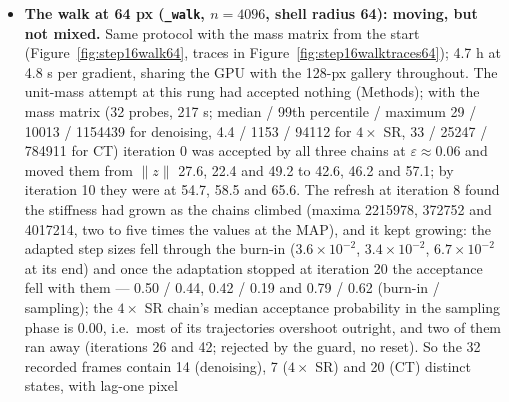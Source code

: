 \documentclass[11pt]{article}
\begin{document}
\begin{itemize}
        mediastinum for $4\times$ SR. The frames are now nearly
        independent: lag-one pixel autocorrelation 0.06, 0.08 and 0.08,
        and the r.m.s.\ difference between consecutive frames (0.108,
        0.108, 0.082) is at or above $\sqrt{2}$ times the std map, the
        value for independent draws. The 32-sample means agree with the
        main run's three-chain means (25.0, 25.6, 27.0 dB) to 0.1 dB on
        CT and fall 0.3 dB short on $4\times$ SR; on denoising the walk's
        26.8 dB is 1.8 dB above the main run's 25.0, which was the mean of
        chains that had stayed near the MAP --- a mean of shell samples
        against a mean of near-MAP states, not a like-for-like comparison.
        Wall time 44 min at 0.73 s per gradient, sharing the GPU with the
        64-px walk and the 128-px gallery (0.52 s per gradient alone).
  \item \textbf{The walk at 64 px (\texttt{\_walk}, $n = 4096$, shell
        radius 64): moving, but not mixed.} Same protocol with the mass
        matrix from the start (Figure~\ref{fig:step16walk64}, traces in
        Figure~\ref{fig:step16walktraces64}); 4.7 h at 4.8 s per gradient,
        sharing the GPU with the 128-px gallery throughout. The unit-mass
        attempt at this rung had accepted nothing (Methods); with the
        mass matrix (32 probes, 217 s; median / 99th percentile / maximum
        29 / 10013 / 1154439 for denoising, 4.4 / 1153 / 94112 for
        $4\times$ SR, 33 / 25247 / 784911 for CT) iteration 0 was accepted
        by all three chains at $\varepsilon \approx 0.06$ and moved them
        from $\|z\|$ 27.6, 22.4 and 49.2 to 42.6, 46.2 and 57.1; by
        iteration 10 they were at 54.7, 58.5 and 65.6. The refresh at
        iteration 8 found the stiffness had grown as the chains climbed
        (maxima 2215978, 372752 and 4017214, two to five times the values
        at the MAP), and it kept growing: the adapted step sizes fell
        through the burn-in ($3.6 \times 10^{-2}$, $3.4 \times 10^{-2}$,
        $6.7 \times 10^{-2}$ at its end) and once the adaptation stopped
        at iteration 20 the acceptance fell with them --- 0.50 / 0.44,
        0.42 / 0.19 and 0.79 / 0.62 (burn-in / sampling); the $4\times$ SR
        chain's median acceptance probability in the sampling phase is
        0.00, i.e.\ most of its trajectories overshoot outright, and two
        of them ran away (iterations 26 and 42; rejected by the guard, no
        reset). So the 32 recorded frames contain 14 (denoising), 7
        ($4\times$ SR) and 20 (CT) distinct states, with lag-one pixel

\end{itemize}
\end{document}
